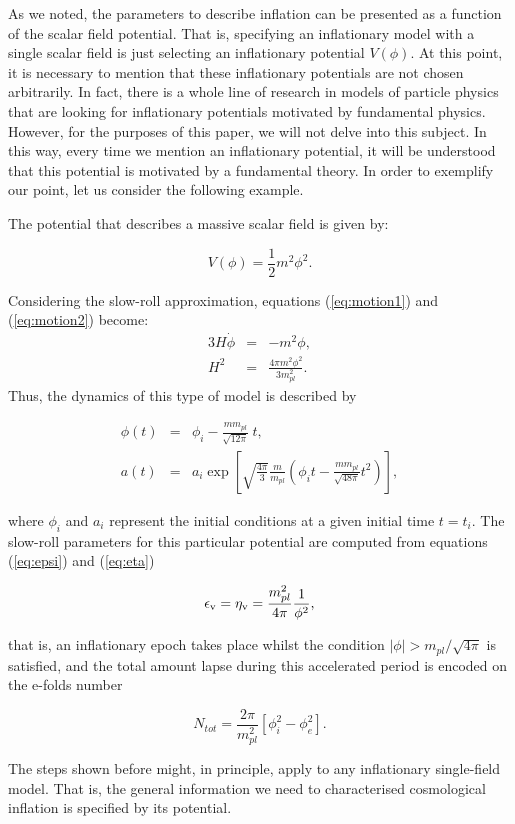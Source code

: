 \documentclass{rmaa}
\def\beq{\begin{equation}}
\def\eeq{\end{equation}}
\def\bea{\begin{eqnarray}}
\def\eea{\end{eqnarray}}
\begin{document}
As we noted, the parameters to describe inflation can be presented
as a function of the scalar field potential. That is, specifying an inflationary 
model with a single scalar field is just selecting an inflationary potential $V(\phi)$. 
At this point, it is necessary to mention that these inflationary potentials are not chosen arbitrarily. 
In fact, there is a whole line of research in models of particle physics that are looking for inflationary potentials 
motivated by fundamental physics. However, for the purposes of this paper, we will not delve into this subject. 
In this way, every time we mention an inflationary potential, it will be 
understood that this potential is motivated by a fundamental theory. 
In order to exemplify our point, let us consider the following example.


The potential that describes a massive scalar field is given by:

\beq \label{eq:mass}
V(\phi)= \frac{1}{2}m^2 \phi^2.
\eeq

\noindent
Considering the slow-roll approximation, equations (\ref{eq:motion1}) and (\ref{eq:motion2}) become:
%
\bea
3H\dot \phi &=& -m^2 \phi, \\
H^2 &=& \frac{4\pi m^2 \phi^2}{3 m_{pl}^2}.\nonumber
\eea
\noindent
Thus, the dynamics of this type of model is described by

\bea
\phi(t)&=&\phi_i - \frac{m m_{pl}}{\sqrt{12 \pi}}~t,\\
a(t)&=& a_i \exp\left[\sqrt{\frac{4\pi}{3}}\frac{m}{m_{pl}}\left( \phi_i t - \frac{m m_{pl}}{\sqrt{48 \pi}}t^2 \right) \right], \nonumber
\eea

\noindent
where $\phi_i$ and $a_i$ represent the initial conditions at a given initial time $t=t_i$.
The slow-roll parameters for this particular potential are computed from 
equations (\ref{eq:epsi}) and (\ref{eq:eta})

\beq
\epsilon_{\rm v}=\eta_{\rm v}= \frac{m_{pl}^2}{4\pi} \frac{1}{\phi^2}, 
\eeq

\noindent
that is, an inflationary epoch takes place whilst the condition $|\phi|> {m_{pl}}/\sqrt{4\pi}$ 
is satisfied, and the total amount lapse during this accelerated period is encoded on the e-folds number

\beq
N_{tot}= \frac{2\pi}{m_{pl}^2}\left[\phi^2_i - \phi^2_e \right].
\eeq 

The steps shown before might, in principle, apply to any inflationary single-field model. 
That is, the general information we need to characterised 
cosmological inflation is specified by its potential. 
\end{document}
